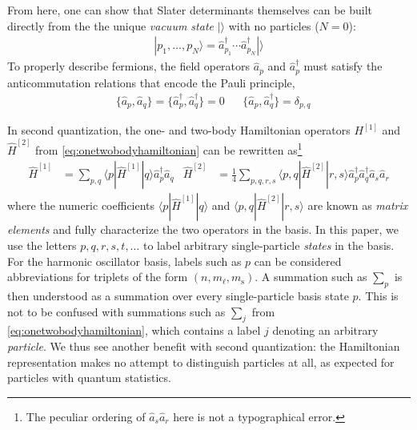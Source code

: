 From here, one can show that Slater determinants themselves can be built directly from the the unique \textit{vacuum state} $|\rangle$ with no particles ($N = 0$):
\begin{align*}
  |p_1, \ldots, p_N\rangle =
  \hat a_{p_1}^\dagger \cdots \hat a_{p_N}^\dagger |\rangle
\end{align*}
To properly describe fermions, the field operators $\hat a_p$ and $\hat a_p^\dagger$ must satisfy the anticommutation relations that encode the Pauli principle,
\begin{align*}
  &\{\hat a_p, \hat a_q\} = \{\hat a_p^\dagger, \hat a_q^\dagger\} = 0 &
  &\{\hat a_p, \hat a_q^\dagger\} = \delta_{p, q}
\end{align*}

In second quantization, the one- and two-body Hamiltonian operators $H^{[1]}$ and $\hat{H}^{[2]}$ from \eqref{eq:onetwobodyhamiltonian} can be rewritten as\footnote{The peculiar ordering of $\hat a_s \hat a_r$ here is not a typographical error.}
\begin{align} \label{eq:second_quantized_hamiltonian}
  \hat H^{[1]} &= \sum_{p, q} \langle p | \hat{H}^{[1]} | q \rangle \hat a_p^\dagger \hat a_q^{} &
  \hat{H}^{[2]} &= \frac{1}{4} \sum_{p, q, r, s} \langle p, q | \hat{H}^{[2]} | r, s \rangle \hat a_p^\dagger \hat a_q^\dagger \hat a_s^{} \hat a_r^{}
\end{align}
where the numeric coefficients $\langle p | \hat{H}^{[1]} | q \rangle$ and $\langle p, q | \hat{H}^{[2]} | r, s \rangle$ are known as \textit{matrix elements} and fully characterize the two operators in the basis.  In this paper, we use the letters $p, q, r, s, t, \ldots$ to label arbitrary single-particle \textit{states} in the basis.  For the harmonic oscillator basis, labels such as $p$ can be considered abbreviations for triplets of the form $(n, m_\ell, m_{\mathrm{s}})$.  A summation such as $\sum_p$ is then understood as a summation over every single-particle basis state $p$.  This is not to be confused with summations such as $\sum_j$ from \eqref{eq:onetwobodyhamiltonian}, which contains a label $j$ denoting an arbitrary \textit{particle}.  We thus see another benefit with second quantization: the Hamiltonian representation makes no attempt to distinguish particles at all, as expected for particles with quantum statistics.

